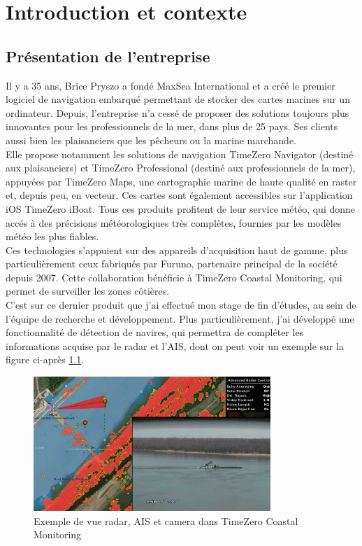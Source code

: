 \chapter{Introduction et contexte}


\section{Présentation de l'entreprise}

Il y a 35 ans, Brice Pryszo a fondé MaxSea International et a créé le premier logiciel de navigation embarqué
permettant de stocker des cartes marines sur un ordinateur. Depuis, l'entreprise n'a cessé de proposer
des solutions toujours plus innovantes pour les professionnels de la mer, dans plus de 25 pays.
Ses clients aussi bien les plaisanciers que les pêcheurs ou la marine marchande. \\
Elle propose notamment les solutions de navigation TimeZero Navigator (destiné aux plaisanciers)
et TimeZero Professional (destiné aux professionnels de la mer), appuyées par TimeZero Maps,
une cartographie marine de haute qualité en raster et, depuis peu, en vecteur.
Ces cartes sont également accessibles sur l'application iOS TimeZero iBoat.
Tous ces produits profitent de leur service météo, qui donne accés à des précisions
météorologiques très complètes, fournies par les modèles météo les plus fiables.\\

Ces technologies s'appuient sur des appareils d'acquisition haut de gamme, plus particulièrement
ceux fabriqués par Furuno, partenaire principal de la société depuis 2007. Cette collaboration
bénéficie à TimeZero Coastal Monitoring, qui permet de surveiller les zones côtières. \\

C'est sur ce dernier produit que j'ai effectué mon stage de fin d'études, au sein de l'équipe
de recherche et développement. Plus particulièrement, j'ai développé une fonctionnalité
de détection de navires, qui permettra de compléter les informations acquise par le radar
et l'AIS, dont on peut voir un exemple sur la figure ci-après \ref{fig:radar}.

\begin{figure}[H]
    \centering
    \includegraphics[width=0.8\textwidth]{./img/ports-harbors-cameras1.jpg}
    \caption{Exemple de vue radar, AIS et camera dans TimeZero Coastal Monitoring}
    \label{fig:radar}
\end{figure}

